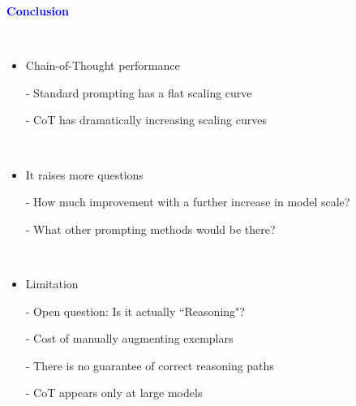 \documentclass[professionalfont]{beamer}
\begin{document}
\begin{frame}
\begin{center}
    { \textbf{\textcolor{blue}{ {\fontsize{12}{14}\selectfont Conclusion} }} }
\end{center}
\\[0.5cm]

{\fontsize{10}{14}\selectfont 
\begin{itemize}
    \item Chain-of-Thought performance
    
    - Standard prompting has a flat scaling curve

    - CoT has dramatically increasing scaling curves

    \\[0.2cm]

    \item It raises more questions

    - How much improvement with a further increase in model scale?

    - What other prompting methods would be there?

    \\[0.2cm]

    \item Limitation

    - Open question: Is it actually ``Reasoning"?

    - Cost of manually augmenting exemplars

    - There is no guarantee of correct reasoning paths

    - CoT appears only at large models
\end{itemize}
}
\end{frame}
\end{document}
